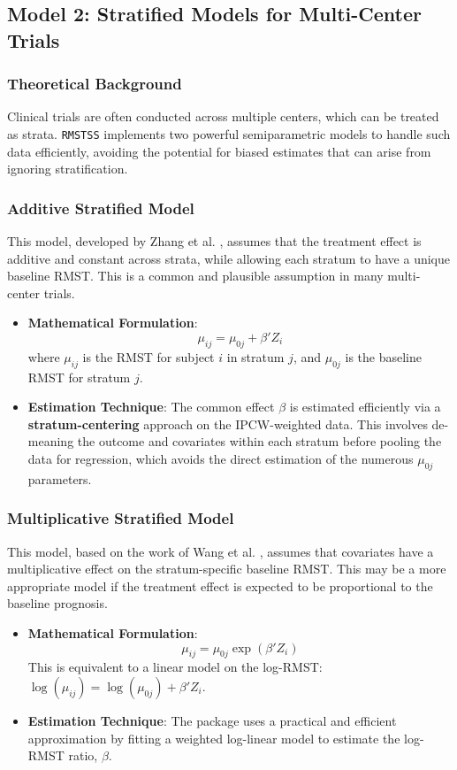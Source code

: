 \documentclass[11pt, a4paper]{article}
\begin{document}
\clearpage

\subsection{Model 2: Stratified Models for Multi-Center Trials}
\subsubsection{Theoretical Background}
Clinical trials are often conducted across multiple centers, which can be treated as strata. \texttt{RMSTSS} implements two powerful semiparametric models to handle such data efficiently, avoiding the potential for biased estimates that can arise from ignoring stratification.

\subsubsection{Additive Stratified Model}
This model, developed by Zhang et al. \cite{zhang2024}, assumes that the treatment effect is additive and constant across strata, while allowing each stratum to have a unique baseline RMST. This is a common and plausible assumption in many multi-center trials.
\begin{itemize}
    \item \textbf{Mathematical Formulation}:
    \begin{equation}
    \mu_{ij} = \mu_{0j} + \beta'Z_i
    \end{equation}
    where $\mu_{ij}$ is the RMST for subject $i$ in stratum $j$, and $\mu_{0j}$ is the baseline RMST for stratum $j$.
    \item \textbf{Estimation Technique}: The common effect $\beta$ is estimated efficiently via a \textbf{stratum-centering} approach on the IPCW-weighted data. This involves de-meaning the outcome and covariates within each stratum before pooling the data for regression, which avoids the direct estimation of the numerous $\mu_{0j}$ parameters.
\end{itemize}

\subsubsection{Multiplicative Stratified Model}
This model, based on the work of Wang et al. \cite{wang2019}, assumes that covariates have a multiplicative effect on the stratum-specific baseline RMST. This may be a more appropriate model if the treatment effect is expected to be proportional to the baseline prognosis.
\begin{itemize}
    \item \textbf{Mathematical Formulation}:
    \begin{equation}
    \mu_{ij} = \mu_{0j} \exp(\beta'Z_i)
    \end{equation}
    This is equivalent to a linear model on the log-RMST: $\log(\mu_{ij}) = \log(\mu_{0j}) + \beta'Z_i$.
    \item \textbf{Estimation Technique}: The package uses a practical and efficient approximation by fitting a weighted log-linear model to estimate the log-RMST ratio, $\beta$.
\end{itemize}
\end{document}
